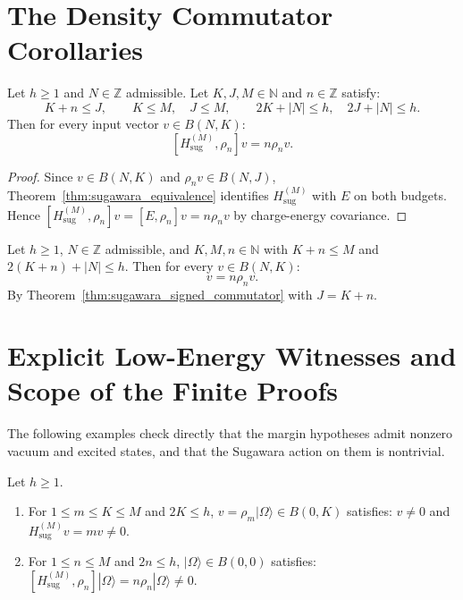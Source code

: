 \section{The Density Commutator Corollaries}

\begin{theorem}
\label{thm:sugawara_signed_commutator}
Let $h \ge 1$ and $N \in \mathbb{Z}$ admissible. Let $K, J, M \in \mathbb{N}$ and $n \in \mathbb{Z}$ satisfy:
\begin{equation}
\label{eq:signed_conditions}
K + n \le J, \qquad K \le M, \quad J \le M, \qquad 2K + |N| \le h, \quad 2J + |N| \le h.
\end{equation}
Then for every input vector $v \in B(N, K)$:
\begin{equation}
\label{eq:signed_commutator}
[H_{\mathrm{sug}}^{(M)}, \rho_n] v = n \rho_n v.
\end{equation}
\end{theorem}

\begin{proof}
Since $v\in B(N,K)$ and $\rho_n v\in B(N,J)$, Theorem~\ref{thm:sugawara_equivalence}
identifies $H_{\mathrm{sug}}^{(M)}$ with $E$ on both budgets. Hence
$[H_{\mathrm{sug}}^{(M)},\rho_n]v=[E,\rho_n]v=n\rho_n v$ by charge-energy
covariance.
\end{proof}

\begin{corollary}
\label{cor:sugawara_raising_commutator}
Let $h \ge 1$, $N \in \mathbb{Z}$ admissible, and $K, M, n \in \mathbb{N}$ with $K + n \le M$ and $2(K + n) + |N| \le h$. Then for every $v \in B(N, K)$:
\begin{equation}
[H_{\mathrm{sug}}^{(M)}, \rho_n] v = n \rho_n v.
\end{equation}
By Theorem~\ref{thm:sugawara_signed_commutator} with $J=K+n$.
\end{corollary}




\section{Explicit Low-Energy Witnesses and Scope of the Finite Proofs}

The following examples check directly that the margin hypotheses admit
nonzero vacuum and excited states, and that the Sugawara action on them is
nontrivial.

\begin{lemma}
\label{lem:sugawara_witnesses}
Let $h \ge 1$.
\begin{enumerate}
    \item For $1 \le m \le K \le M$ and $2K \le h$, $v = \rho_m |\Omega\rangle \in B(0, K)$ satisfies:
    $v \neq 0$ and $H_{\mathrm{sug}}^{(M)} v = m v \neq 0$.
    \item For $1 \le n \le M$ and $2n \le h$, $|\Omega\rangle \in B(0, 0)$ satisfies:
    $[H_{\mathrm{sug}}^{(M)}, \rho_n] |\Omega\rangle = n \rho_n |\Omega\rangle \neq 0$.
\end{enumerate}
\end{lemma}

